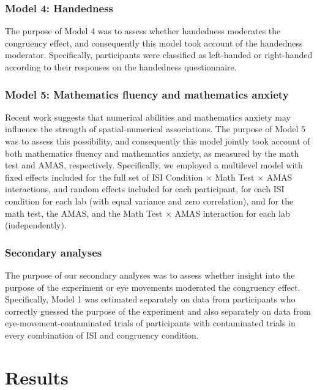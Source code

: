 \documentclass[man,floatsintext]{apa6}
\theoremstyle{definition}
\theoremstyle{definition}
\theoremstyle{definition}
\theoremstyle{remark}
\begin{document}
\subsubsection{Model 4: Handedness}\label{model-4-handedness}

The purpose of Model 4 was to assess whether handedness moderates the
congruency effect, and consequently this model took account of the
handedness moderator. Specifically, participants were classified as
left-handed or right-handed according to their responses on the
handedness questionnaire.

\subsubsection{Model 5: Mathematics fluency and mathematics
anxiety}\label{model-5-mathematics-fluency-and-mathematics-anxiety}

Recent work suggests that numerical abilities \autocite{Fischer:2006er}
and mathematics anxiety \autocite{Georges:2016gn} may influence the
strength of spatial-numerical associations. The purpose of Model 5 was
to assess this possibility, and consequently this model jointly took
account of both mathematics fluency and mathematics anxiety, as measured
by the math test and AMAS, respectively. Specifically, we employed a
multilevel model with fixed effects included for the full set of ISI
Condition \(\times\) Math Test \(\times\) AMAS interactions, and random
effects included for each participant, for each ISI condition for each
lab (with equal variance and zero correlation), and for the math test,
the AMAS, and the Math Test \(\times\) AMAS interaction for each lab
(independently).

\subsubsection{Secondary analyses}\label{secondary-analyses}

The purpose of our secondary analyses was to assess whether insight into
the purpose of the experiment or eye movements moderated the congruency
effect. Specifically, Model 1 was estimated separately on data from
participants who correctly guessed the purpose of the experiment and
also separately on data from eye-movement-contaminated trials of
participants with contaminated trials in every combination of ISI and
congruency condition.

\section{Results}\label{results}
\end{document}
